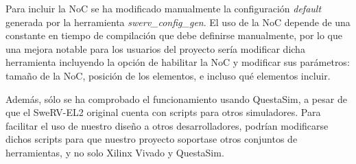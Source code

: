 Para incluir la NoC se ha modificado manualmente la configuración \textit{default} generada por la herramienta \textit{swerv\_config\_gen}. El uso de la NoC depende de una constante en tiempo de compilación que debe definirse manualmente, por lo que una mejora notable para los usuarios del proyecto sería modificar dicha herramienta incluyendo la opción de habilitar la NoC y modificar sus parámetros: tamaño de la NoC, posición de los elementos, e incluso qué elementos incluir.

Además, sólo se ha comprobado el funcionamiento usando QuestaSim, a pesar de que el SweRV-EL2 original cuenta con scripts para otros simuladores. Para facilitar el uso de nuestro diseño a otros desarrolladores, podrían modificarse dichos scripts para que nuestro proyecto soportase otros conjuntos de herramientas, y no solo Xilinx Vivado y QuestaSim.
